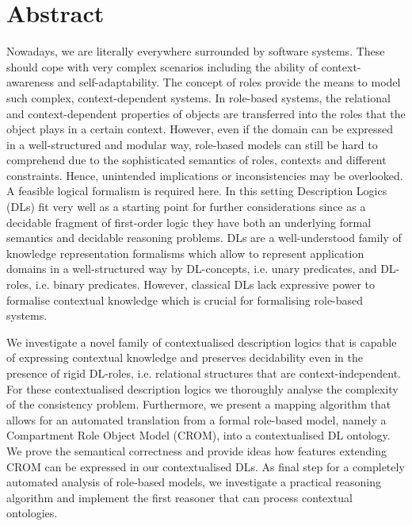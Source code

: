 
\chapter*{Abstract}
Nowadays, we are literally everywhere surrounded by software systems. These should cope with very
complex scenarios including the ability of context-awareness and self-adaptability. The concept of
roles provide the means to model such complex, context-dependent systems. In role-based systems, the
relational and context-dependent properties of objects are transferred into the roles that the
object plays in a certain context. However, even if the domain can be expressed in a well-structured
and modular way, role-based models can still be hard to comprehend due to the sophisticated
semantics of roles, contexts and different constraints. Hence, unintended implications or
inconsistencies may be overlooked. A feasible logical formalism is required here. In this setting
Description Logics (DLs) fit very well as a starting point for further considerations since as a
decidable fragment of first-order logic they have both an underlying formal semantics and decidable
reasoning problems. DLs are a well-understood family of knowledge representation formalisms which
allow to represent application domains in a well-structured way by DL-concepts, i.e. unary
predicates, and DL-roles, i.e. binary predicates. However, classical DLs lack expressive power to
formalise contextual knowledge which is crucial for formalising role-based systems.

We investigate a novel family of contextualised description logics that is capable of expressing
contextual knowledge and preserves decidability even in the presence of rigid DL-roles,
i.e. relational structures that are context-independent. For these contextualised description logics
we thoroughly analyse the complexity of the consistency problem.  Furthermore, we present a mapping
algorithm that allows for an automated translation from a formal role-based model, namely a
Compartment Role Object Model (CROM), into a contextualised DL ontology. We prove the semantical
correctness and provide ideas how features extending CROM can be expressed in our contextualised
DLs. As final step for a completely automated analysis of role-based models, we investigate a
practical reasoning algorithm and implement the first reasoner that can process contextual
ontologies.




